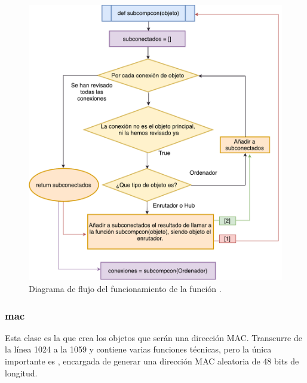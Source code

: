 \documentclass[a4paper, 11pt]{report} %
\begin{document}
\newpage

\thispagestyle{empty}
\begin{figure}
\includegraphics[width=\textwidth]{Resources/Diagramas/Compcon.pdf}

\vspace*{1cm}
\caption[Diagrama de flujo de la función \texttt{compcon}]{\label{fig:compcon}
Diagrama de flujo del funcionamiento de la función .
}
\end{figure}

\clearpage


\subsubsection{mac}
Esta clase es la que crea los objetos que serán una dirección MAC. Transcurre de la línea 1024 a la 1059 y contiene varias funciones técnicas, pero la única importante es , encargada de generar una dirección MAC aleatoria de 48 bits de longitud.
\end{document}
